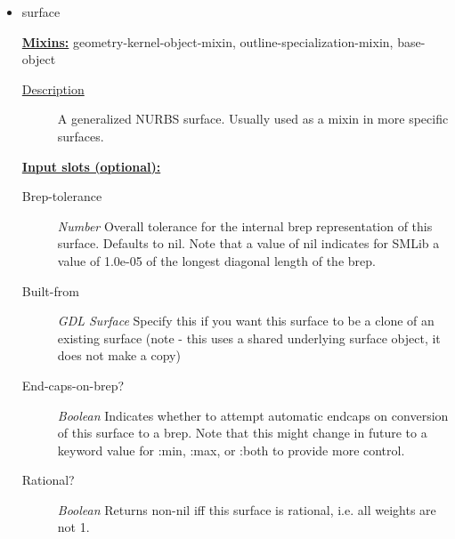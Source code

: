 \documentclass [11pt]{book}
\begin{document}
\begin{itemize}
\begin{description}
\end{description}









\item {}surface


\textbf{
\underline{Mixins:}} geometry-kernel-object-mixin, outline-specialization-mixin, base-object





\begin{description}

\item [
\underline{Description}]


A generalized NURBS surface. 
Usually used as a mixin in more specific surfaces.



\end{description}








\textbf{
\underline{Input slots (optional):}}

\begin{description}

\item [Brep-tolerance]
\emph{Number} Overall tolerance for the internal brep representation of this surface.
Defaults to nil. Note that a value of nil indicates for SMLib a value of 1.0e-05 of
the longest diagonal length of the brep.


\item [Built-from]
\emph{GDL Surface} Specify this if you want this surface to be a
clone of an existing surface (note - this uses a shared underlying
surface object, it does not make a copy)


\item [End-caps-on-brep?]
\emph{Boolean} Indicates whether to attempt automatic endcaps on conversion
of this surface to a brep.
Note that this might change in future to a keyword value
for :min, :max, or :both to provide more control.


\item [Rational?]
\emph{Boolean} Returns non-nil iff this surface is rational, i.e. all weights are not 1.



\end{description}
\end{itemize}
\end{document}
